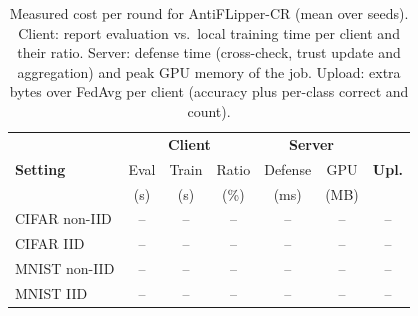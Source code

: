 \begin{table}[t]
\centering
\caption{Measured cost per round for AntiFLipper-CR (mean over seeds). Client: report evaluation vs.\ local training time per client and their ratio. Server: defense time (cross-check, trust update and aggregation) and peak GPU memory of the job. Upload: extra bytes over FedAvg per client (accuracy plus per-class correct and count).}
\label{tab:cost}
\renewcommand{\arraystretch}{1.1}
\scriptsize
\setlength{\tabcolsep}{2.5pt}
\begin{tabular}{l|ccc|cc|c}
\hline
& \multicolumn{3}{c|}{\textbf{Client}} & \multicolumn{2}{c|}{\textbf{Server}} & \\
\textbf{Setting} & Eval & Train & Ratio & Defense & GPU & \textbf{Upl.} \\
 & (s) & (s) & (\%) & (ms) & (MB) & \\
\hline
CIFAR non-IID & -- & -- & -- & -- & -- & -- \\
CIFAR IID & -- & -- & -- & -- & -- & -- \\
MNIST non-IID & -- & -- & -- & -- & -- & -- \\
MNIST IID & -- & -- & -- & -- & -- & -- \\
\hline
\end{tabular}
\end{table}
